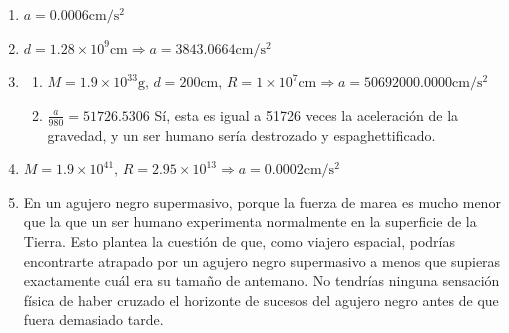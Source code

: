 \documentclass[a4paper]{article}
\newcommand{\cm}{\text{cm}}
\newcommand{\s}{\text{s}}
\newcommand{\g}{\text{g}}
\begin{document}
\begin{enumerate}
	\item $a =  0.0006 \cm/\s^2$
	\item $d = 1.28\times 10^9 \cm \Rightarrow a = 3843.0664 \cm/\s^2$
	\item 
	\begin{enumerate}
		\item $M = 1.9\times 10^{33}  \g, \, d = 200 \cm, \, R = 1\times 10^7 \cm \Rightarrow a = 50692000.0000 \cm/\s^2$
		\item $\frac{a}{980} = 51726.5306$  Sí, esta es igual a 51726 veces la aceleración de la gravedad, y un ser humano sería destrozado y espaghettificado.
	\end{enumerate}
	\item $M = 1.9\times10^{41}, \, R = 2.95\times10^{13}	 \Rightarrow a = 0.0002 \cm/\s^2$
	\item En un agujero negro supermasivo, porque la fuerza de marea es mucho menor que la que un ser humano experimenta normalmente en la superficie de la Tierra. Esto plantea la cuestión de que, como viajero espacial, podrías encontrarte atrapado por un agujero negro supermasivo a menos que supieras exactamente cuál era su tamaño de antemano. No tendrías ninguna sensación física de haber cruzado el horizonte de sucesos del agujero negro antes de que fuera demasiado tarde.
\end{enumerate}
\end{document}
